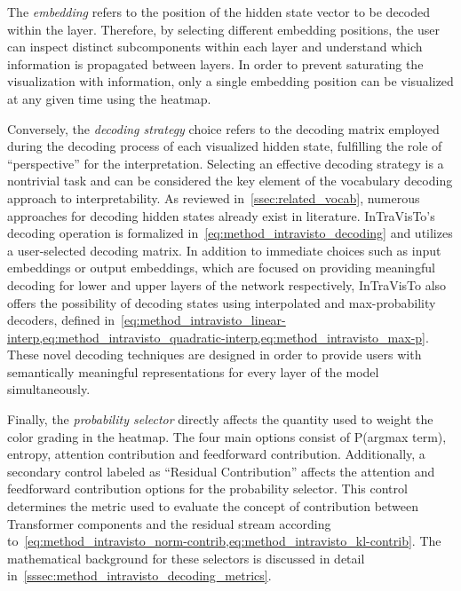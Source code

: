 The \emph{embedding} refers to the position of the hidden state vector to be decoded within the layer.
Therefore, by selecting different embedding positions, the user can inspect distinct subcomponents within each layer and understand which information is propagated between layers.
In order to prevent saturating the visualization with information, only a single embedding position can be visualized at any given time using the heatmap.

Conversely, the \emph{decoding strategy} choice refers to the decoding matrix employed during the decoding process of each visualized hidden state, fulfilling the role of ``perspective'' for the interpretation.
Selecting an effective decoding strategy is a nontrivial task and can be considered the key element of the vocabulary decoding approach to interpretability.
As reviewed in~\cref{ssec:related_vocab}, numerous approaches for decoding hidden states already exist in literature.
InTraVisTo's decoding operation is formalized in~\cref{eq:method_intravisto_decoding} and utilizes a user-selected decoding matrix.
In addition to immediate choices such as input embeddings or output embeddings, which are focused on providing meaningful decoding for lower and upper layers of the network respectively, InTraVisTo also offers the possibility of decoding states using interpolated and max-probability decoders, defined in~\cref{eq:method_intravisto_linear-interp,eq:method_intravisto_quadratic-interp,eq:method_intravisto_max-p}.
These novel decoding techniques are designed in order to provide users with semantically meaningful representations for every layer of the model simultaneously.

Finally, the \emph{probability selector} directly affects the quantity used to weight the color grading in the heatmap.
The four main options consist of P(argmax term), entropy, attention contribution and feedforward contribution. %
Additionally, a secondary control labeled as ``Residual Contribution'' affects the attention and feedforward contribution options for the probability selector.
This control determines the metric used to evaluate the concept of contribution between Transformer components and the residual stream according to~\cref{eq:method_intravisto_norm-contrib,eq:method_intravisto_kl-contrib}.
The mathematical background for these selectors is discussed in detail in~\cref{sssec:method_intravisto_decoding_metrics}.

